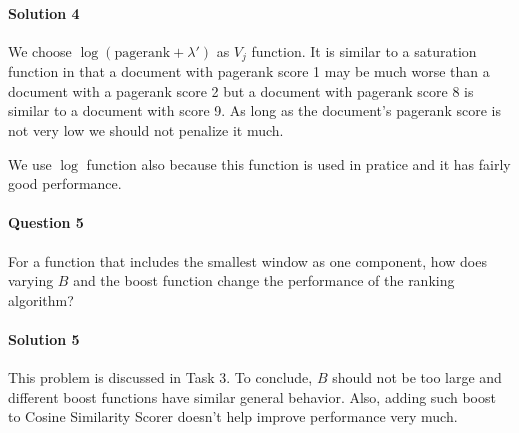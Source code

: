 \documentclass{article}
\begin{document}
\paragraph{Solution 4}
We choose $\log (\mbox{pagerank} + \lambda')$ as $V_j$ function. It is similar to a saturation function in that a document with pagerank score 1 may be much worse than a document with a pagerank score 2 but a document with pagerank score 8 is similar to a document with score 9. As long as the document's pagerank score is not very low we should not penalize it much.

We use $\log$ function also because this function is used in pratice and it has fairly good performance.

\paragraph{Question 5}
For a function that includes the smallest window as one component, how does varying $B$ and the boost function change the performance of the ranking algorithm?

\vspace{-3mm}
\paragraph{Solution 5}
This problem is discussed in Task 3. To conclude, $B$ should not be too large and different boost functions have similar general behavior. Also, adding such boost to Cosine Similarity Scorer doesn't help improve performance very much.
\end{document}
